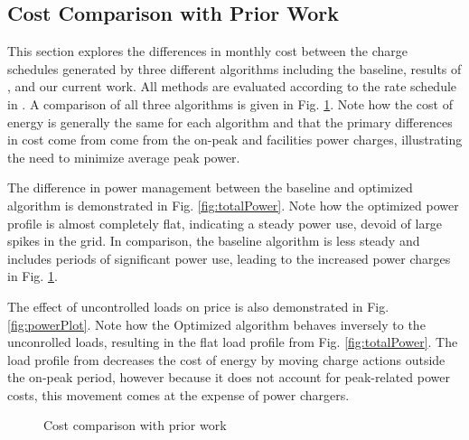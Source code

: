 \subsection{Cost Comparison with Prior Work\label{sec:results:prior}} 
This section explores the differences in monthly cost between the charge schedules generated by three different algorithms including the baseline, results of \cite{He_2019_Fast}, and our current work. All methods are evaluated according to the rate schedule in \cite{rocky_mountain_power_rocky_2021}. A comparison of all three algorithms is given in Fig. \ref{fig:costComparison}. Note how the cost of energy is generally the same for each algorithm and that the primary differences in cost come from come from the on-peak and facilities power charges, illustrating the need to minimize average peak power.
\par The difference in power management between the baseline and optimized algorithm is demonstrated in Fig. \ref{fig:totalPower}. Note how the optimized power profile is almost completely flat, indicating a steady power use, devoid of large spikes in the grid. In comparison, the baseline algorithm is less steady and includes periods of significant power use, leading to the increased power charges in Fig. \ref{fig:costComparison}.
\par The effect of uncontrolled loads on price is also demonstrated in Fig. \ref{fig:powerPlot}. Note how the Optimized algorithm behaves inversely to the unconrolled loads, resulting in the flat load profile from Fig. \ref{fig:totalPower}. The load profile from \cite{He_2019_Fast} decreases the cost of energy by moving charge actions outside the on-peak period, however because it does not account for peak-related power costs, this movement comes at the expense of power chargers. 
\begin{figure}
	\centering
	\caption{Cost comparison with prior work}
	\label{fig:costComparison}
\end{figure} 

\begin{figure*}
	\centering
	\caption{15-Minute average power for one day}
	\label{fig:totalPower}
\end{figure*}
\begin{figure*}
	\centering
	\caption{Comparison between uncontrolled and bus loads}
	\label{fig:powerPlot}
\end{figure*}

